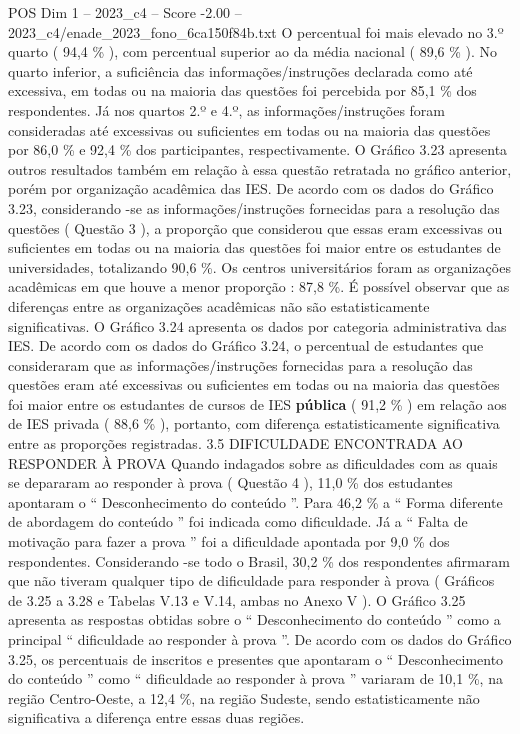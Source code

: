 \begin{textsample}{POS Dim 1 – 2023\_c4 – Score -2.00 – 2023\_c4/enade\_2023\_fono\_6ca150f84b.txt}
O percentual foi mais elevado no 3.º quarto ( 94,4 \% ), com percentual superior ao da média nacional ( 89,6 \% ).
No quarto inferior, a suficiência das informações/instruções declarada como até excessiva, em todas ou na maioria das questões foi percebida por 85,1 \% dos respondentes.
Já nos quartos 2.º e 4.º, as informações/instruções foram consideradas até excessivas ou suficientes em todas ou na maioria das questões por 86,0 \% e 92,4 \% dos participantes, respectivamente.
O Gráfico 3.23 apresenta outros resultados também em relação à essa questão retratada no gráfico anterior, porém por organização acadêmica das IES.
De acordo com os dados do Gráfico 3.23, considerando -se as informações/instruções fornecidas para a resolução das questões ( Questão 3 ), a proporção que considerou que essas eram excessivas ou suficientes em todas ou na maioria das questões foi maior entre os estudantes de universidades, totalizando 90,6 \%.
Os centros universitários foram as organizações acadêmicas em que houve a menor proporção : 87,8 \%.
É possível observar que as diferenças entre as organizações acadêmicas não são estatisticamente significativas.
O Gráfico 3.24 apresenta os dados por categoria administrativa das IES.
De acordo com os dados do Gráfico 3.24, o percentual de estudantes que consideraram que as informações/instruções fornecidas para a resolução das questões eram até excessivas ou suficientes em todas ou na maioria das questões foi maior entre os estudantes de cursos de IES \textbf{pública} ( 91,2 \% ) em relação aos de IES privada ( 88,6 \% ), portanto, com diferença estatisticamente significativa entre as proporções registradas. 3.5 DIFICULDADE ENCONTRADA AO RESPONDER À PROVA Quando indagados sobre as dificuldades com as quais se depararam ao responder à prova ( Questão 4 ), 11,0 \% dos estudantes apontaram o “ Desconhecimento do conteúdo ”.
Para 46,2 \% a “ Forma diferente de abordagem do conteúdo ” foi indicada como dificuldade.
Já a “ Falta de motivação para fazer a prova ” foi a dificuldade apontada por 9,0 \% dos respondentes.
Considerando -se todo o Brasil, 30,2 \% dos respondentes afirmaram que não tiveram qualquer tipo de dificuldade para responder à prova ( Gráficos de 3.25 a 3.28 e Tabelas V.13 e V.14, ambas no Anexo V ).
O Gráfico 3.25 apresenta as respostas obtidas sobre o “ Desconhecimento do conteúdo ” como a principal “ dificuldade ao responder à prova ”.
De acordo com os dados do Gráfico 3.25, os percentuais de inscritos e presentes que apontaram o “ Desconhecimento do conteúdo ” como “ dificuldade ao responder à prova ” variaram de 10,1 \%, na região Centro-Oeste, a 12,4 \%, na região Sudeste, sendo estatisticamente não significativa a diferença entre essas duas regiões.

\end{textsample}
